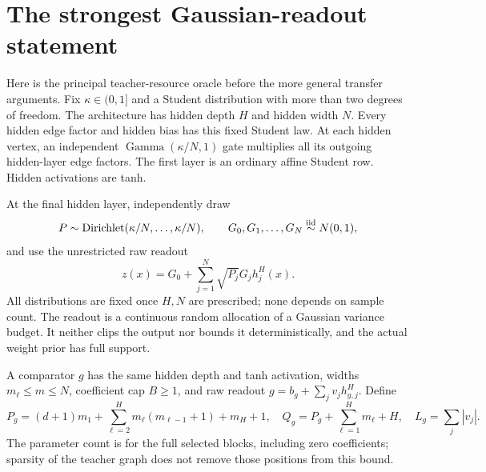 \section{The strongest Gaussian-readout statement}
\label{sec:main-raw-statement}
Here is the principal teacher-resource oracle before the more general
transfer arguments. Fix $\kappa\in(0,1]$ and a Student distribution
with more than two degrees of freedom. The architecture has hidden
depth $H$ and hidden width $N$. Every hidden edge factor and hidden
bias has this fixed Student law. At each hidden vertex, an independent
$\operatorname{Gamma}(\kappa/N,1)$ gate multiplies all its outgoing
hidden-layer edge factors. The first layer is an ordinary affine
Student row. Hidden activations are tanh.

At the final hidden layer, independently draw
\[
 P\sim\operatorname{Dirichlet}(\kappa/N,\ldots,\kappa/N),
 \qquad G_0,G_1,\ldots,G_N\stackrel{\rm iid}{\sim}N(0,1),
\]
and use the unrestricted raw readout
\[
 z(x)=G_0+\sum_{j=1}^N\sqrt{P_j}G_j h_j^H(x).
\]
All distributions are fixed once $H,N$ are prescribed; none depends on
sample count. The readout is a continuous random allocation of a
Gaussian variance budget. It neither clips the output nor bounds it
deterministically, and the actual weight prior has full support.

A comparator $g$ has the same hidden depth and tanh activation, widths
$m_\ell\le m\le N$, coefficient cap $B\ge1$, and raw readout
$g=b_g+\sum_jv_jh_{g,j}^H$. Define
\[
 P_g=(d+1)m_1+\sum_{\ell=2}^Hm_\ell(m_{\ell-1}+1)+m_H+1,
 \quad Q_g=P_g+\sum_{\ell=1}^Hm_\ell+H,
 \quad L_g=\sum_j|v_j|.
\]
The parameter count is for the full selected blocks, including zero
coefficients; sparsity of the teacher graph does not remove those
positions from this bound.

